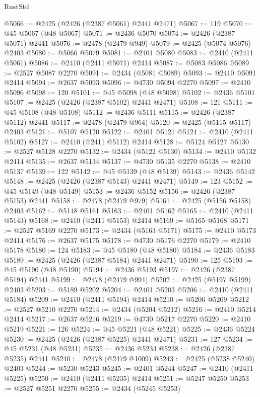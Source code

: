 \begin{lexlean}{RustStd}
\begin{coremodule}
@5066 := @2425 (@2426 (@2387 @5061) @2441 @2471)
@5067 := 119
@5070 := @45 @5067 (@48 @5067)
@5071 := @2436 @5070
@5074 := @2426 (@2387 @5071) @2441
@5076 := @2478 (@2479 @949)
@5079 := @2425 (@5074 @5076) @2403
@5080 := @5066 @5079
@5081 := @2401 @5080
@5083 := @2410 (@2411 @5061)
@5086 := @2410 (@2411 @5071) @2414
@5087 := @5083 @5086
@5089 := @2527 @5087 @2270
@5091 := @2434 (@5081 @5089)
@5093 := @2410 @5091 @2414
@5094 := @2637 @5093
@5096 := @4730 @5094 @2270
@5097 := @2410 @5096
@5098 := 120
@5101 := @45 @5098 (@48 @5098)
@5102 := @2436 @5101
@5107 := @2425 (@2426 (@2387 @5102) @2441 @2471)
@5108 := 121
@5111 := @45 @5108 (@48 @5108)
@5112 := @2436 @5111
@5115 := @2426 (@2387 @5112) @2441
@5117 := @2478 (@2479 @964)
@5120 := @2425 (@5115 @5117) @2403
@5121 := @5107 @5120
@5122 := @2401 @5121
@5124 := @2410 (@2411 @5102)
@5127 := @2410 (@2411 @5112) @2414
@5128 := @5124 @5127
@5130 := @2527 @5128 @2270
@5132 := @2434 (@5122 @5130)
@5134 := @2410 @5132 @2414
@5135 := @2637 @5134
@5137 := @4730 @5135 @2270
@5138 := @2410 @5137
@5139 := 122
@5142 := @45 @5139 (@48 @5139)
@5143 := @2436 @5142
@5148 := @2425 (@2426 (@2387 @5143) @2441 @2471)
@5149 := 123
@5152 := @45 @5149 (@48 @5149)
@5153 := @2436 @5152
@5156 := @2426 (@2387 @5153) @2441
@5158 := @2478 (@2479 @979)
@5161 := @2425 (@5156 @5158) @2403
@5162 := @5148 @5161
@5163 := @2401 @5162
@5165 := @2410 (@2411 @5143)
@5168 := @2410 (@2411 @5153) @2414
@5169 := @5165 @5168
@5171 := @2527 @5169 @2270
@5173 := @2434 (@5163 @5171)
@5175 := @2410 @5173 @2414
@5176 := @2637 @5175
@5178 := @4730 @5176 @2270
@5179 := @2410 @5178
@5180 := 124
@5183 := @45 @5180 (@48 @5180)
@5184 := @2436 @5183
@5189 := @2425 (@2426 (@2387 @5184) @2441 @2471)
@5190 := 125
@5193 := @45 @5190 (@48 @5190)
@5194 := @2436 @5193
@5197 := @2426 (@2387 @5194) @2441
@5199 := @2478 (@2479 @994)
@5202 := @2425 (@5197 @5199) @2403
@5203 := @5189 @5202
@5204 := @2401 @5203
@5206 := @2410 (@2411 @5184)
@5209 := @2410 (@2411 @5194) @2414
@5210 := @5206 @5209
@5212 := @2527 @5210 @2270
@5214 := @2434 (@5204 @5212)
@5216 := @2410 @5214 @2414
@5217 := @2637 @5216
@5219 := @4730 @5217 @2270
@5220 := @2410 @5219
@5221 := 126
@5224 := @45 @5221 (@48 @5221)
@5225 := @2436 @5224
@5230 := @2425 (@2426 (@2387 @5225) @2441 @2471)
@5231 := 127
@5234 := @45 @5231 (@48 @5231)
@5235 := @2436 @5234
@5238 := @2426 (@2387 @5235) @2441
@5240 := @2478 (@2479 @1009)
@5243 := @2425 (@5238 @5240) @2403
@5244 := @5230 @5243
@5245 := @2401 @5244
@5247 := @2410 (@2411 @5225)
@5250 := @2410 (@2411 @5235) @2414
@5251 := @5247 @5250
@5253 := @2527 @5251 @2270
@5255 := @2434 (@5245 @5253)

\end{coremodule}
\end{lexlean}
